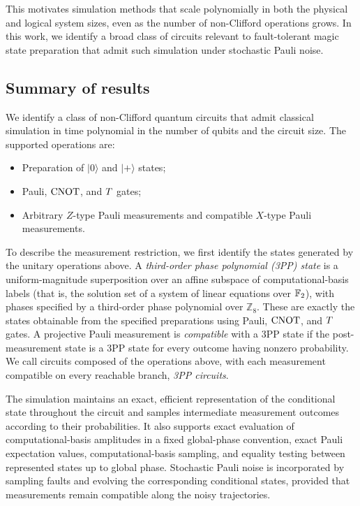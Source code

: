 This motivates simulation methods that scale polynomially in both the physical and logical system sizes, even as the number of non-Clifford operations grows. In this work, we identify a broad class of circuits relevant to fault-tolerant magic state preparation that admit such simulation under stochastic Pauli noise.
\subsection{Summary of results}

We identify a class of non-Clifford quantum circuits that admit classical simulation in time polynomial in the number of qubits and the circuit size. The supported operations are:
\begin{itemize}
    \item Preparation of $|0\rangle$ and $|+\rangle$ states;
    \item Pauli, $\operatorname{CNOT}$, and $T$ gates;
    \item Arbitrary $Z$-type Pauli measurements and compatible $X$-type Pauli measurements.
\end{itemize}
To describe the measurement restriction, we first identify the states generated by the unitary operations above. A \emph{third-order phase polynomial (3PP) state} is a uniform-magnitude superposition over an affine subspace of computational-basis labels (that is, the solution set of a system of linear equations over $\mathbb{F}_2$), with phases specified by a third-order phase polynomial over $\mathbb{Z}_8$. These are exactly the states obtainable from the specified preparations using Pauli, $\operatorname{CNOT}$, and $T$ gates. A projective Pauli measurement is \emph{compatible} with a 3PP state if the post-measurement state is a 3PP state for every outcome having nonzero probability. We call circuits composed of the operations above, with each measurement compatible on every reachable branch, \emph{3PP circuits}.

The simulation maintains an exact, efficient representation of the conditional state throughout the circuit and samples intermediate measurement outcomes according to their probabilities. It also supports exact evaluation of computational-basis amplitudes in a fixed global-phase convention, exact Pauli expectation values, computational-basis sampling, and equality testing between represented states up to global phase. Stochastic Pauli noise is incorporated by sampling faults and evolving the corresponding conditional states, provided that measurements remain compatible along the noisy trajectories.

